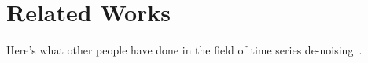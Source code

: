 \section{Related Works}
\label{sec:related-works}

Here's what other people have done in the field of time series de-noising~\cite{fan2019brief}.

